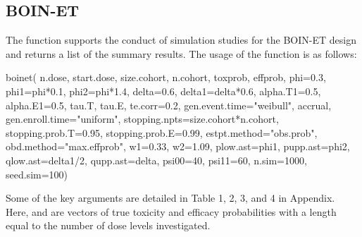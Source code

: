 \subsection{BOIN-ET}
The  function supports the conduct of simulation studies for the BOIN-ET design and returns a list of the summary results. The usage of the  function is as follows:
\begin{example}
boinet(
  n.dose, start.dose, size.cohort, n.cohort,
  toxprob, effprob,
  phi=0.3, phi1=phi*0.1, phi2=phi*1.4, delta=0.6, delta1=delta*0.6,
  alpha.T1=0.5, alpha.E1=0.5, tau.T, tau.E,
  te.corr=0.2, gen.event.time="weibull",
  accrual, gen.enroll.time="uniform",
  stopping.npts=size.cohort*n.cohort,
  stopping.prob.T=0.95, stopping.prob.E=0.99,
  estpt.method="obs.prob", obd.method="max.effprob",
  w1=0.33, w2=1.09,
  plow.ast=phi1, pupp.ast=phi2, qlow.ast=delta1/2, qupp.ast=delta,
  psi00=40, psi11=60,
  n.sim=1000, seed.sim=100)
\end{example}
Some of the key arguments are detailed in Table 1, 2, 3, and 4 in Appendix. Here,  and  are vectors of true toxicity and efficacy probabilities with a length equal to the number of dose levels investigated.

